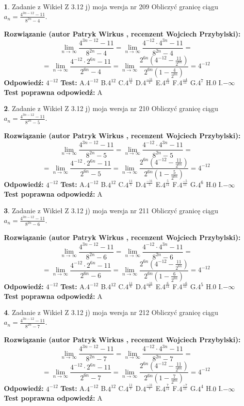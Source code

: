 \documentclass[12pt, a4paper]{article}
\theoremstyle{definition} %
\newtheorem{zad}{}
\newcommand{\zadStart}[1]{\begin{zad}#1\newline}
\newcommand{\zadStop}{\end{zad}}
\newcommand{\rozwStart}[2]{\noindent \textbf{Rozwiązanie (autor #1 , recenzent #2): }\newline}
\newcommand{\rozwStop}{\newline}
\newcommand{\odpStart}{\noindent \textbf{Odpowiedź:}\newline}
\newcommand{\odpStop}{\newline}
\newcommand{\testStart}{\noindent \textbf{Test:}\newline}
\newcommand{\testStop}{\newline}
\newcommand{\kluczStart}{\noindent \textbf{Test poprawna odpowiedź:}\newline}
\newcommand{\kluczStop}{\newline}
\begin{document}
\zadStart{Zadanie z Wikieł Z 3.12 j) moja wersja nr 209}
Obliczyć granicę ciągu $a_{n}=\frac{4^{3n-12}-11}{8^{2n}-4}$.
\zadStop
\rozwStart{Patryk Wirkus}{Wojciech Przybylski}
$$\lim\limits_{n\to\infty}\frac{4^{3n-12}-11}{8^{2n}-4}= \lim\limits_{n\to\infty}\frac{4^{-12} \cdot 4^{3n}-11}{8^{2n}-4}=$$
$$= \lim\limits_{n\to\infty}\frac{4^{-12} \cdot 2^{6n}-11}{2^{6n}-4}= \lim\limits_{n\to\infty}\frac{2^{6n}(4^{-12} - \frac{11}{2^{6n}})}{2^{6n}(1-\frac{4}{2^{6n}})}= 4^{-12}$$
\rozwStop
\odpStart
$4^{-12}$
\odpStop
\testStart
A.$4^{-12}$
B.$4^{12}$
C.$4^{\frac{11}{4}}$
D.$4^{\frac{-11}{4}}$
E.$4^{\frac{4}{11}}$
F.$4^{\frac{-4}{11}}$
G.$4^{7}$
H.$0$
I.$-\infty$
\testStop
\kluczStart
A
\kluczStop



\zadStart{Zadanie z Wikieł Z 3.12 j) moja wersja nr 210}
Obliczyć granicę ciągu $a_{n}=\frac{4^{3n-12}-11}{8^{2n}-5}$.
\zadStop
\rozwStart{Patryk Wirkus}{Wojciech Przybylski}
$$\lim\limits_{n\to\infty}\frac{4^{3n-12}-11}{8^{2n}-5}= \lim\limits_{n\to\infty}\frac{4^{-12} \cdot 4^{3n}-11}{8^{2n}-5}=$$
$$= \lim\limits_{n\to\infty}\frac{4^{-12} \cdot 2^{6n}-11}{2^{6n}-5}= \lim\limits_{n\to\infty}\frac{2^{6n}(4^{-12} - \frac{11}{2^{6n}})}{2^{6n}(1-\frac{5}{2^{6n}})}= 4^{-12}$$
\rozwStop
\odpStart
$4^{-12}$
\odpStop
\testStart
A.$4^{-12}$
B.$4^{12}$
C.$4^{\frac{11}{5}}$
D.$4^{\frac{-11}{5}}$
E.$4^{\frac{5}{11}}$
F.$4^{\frac{-5}{11}}$
G.$4^{6}$
H.$0$
I.$-\infty$
\testStop
\kluczStart
A
\kluczStop



\zadStart{Zadanie z Wikieł Z 3.12 j) moja wersja nr 211}
Obliczyć granicę ciągu $a_{n}=\frac{4^{3n-12}-11}{8^{2n}-6}$.
\zadStop
\rozwStart{Patryk Wirkus}{Wojciech Przybylski}
$$\lim\limits_{n\to\infty}\frac{4^{3n-12}-11}{8^{2n}-6}= \lim\limits_{n\to\infty}\frac{4^{-12} \cdot 4^{3n}-11}{8^{2n}-6}=$$
$$= \lim\limits_{n\to\infty}\frac{4^{-12} \cdot 2^{6n}-11}{2^{6n}-6}= \lim\limits_{n\to\infty}\frac{2^{6n}(4^{-12} - \frac{11}{2^{6n}})}{2^{6n}(1-\frac{6}{2^{6n}})}= 4^{-12}$$
\rozwStop
\odpStart
$4^{-12}$
\odpStop
\testStart
A.$4^{-12}$
B.$4^{12}$
C.$4^{\frac{11}{6}}$
D.$4^{\frac{-11}{6}}$
E.$4^{\frac{6}{11}}$
F.$4^{\frac{-6}{11}}$
G.$4^{5}$
H.$0$
I.$-\infty$
\testStop
\kluczStart
A
\kluczStop



\zadStart{Zadanie z Wikieł Z 3.12 j) moja wersja nr 212}
Obliczyć granicę ciągu $a_{n}=\frac{4^{3n-12}-11}{8^{2n}-7}$.
\zadStop
\rozwStart{Patryk Wirkus}{Wojciech Przybylski}
$$\lim\limits_{n\to\infty}\frac{4^{3n-12}-11}{8^{2n}-7}= \lim\limits_{n\to\infty}\frac{4^{-12} \cdot 4^{3n}-11}{8^{2n}-7}=$$
$$= \lim\limits_{n\to\infty}\frac{4^{-12} \cdot 2^{6n}-11}{2^{6n}-7}= \lim\limits_{n\to\infty}\frac{2^{6n}(4^{-12} - \frac{11}{2^{6n}})}{2^{6n}(1-\frac{7}{2^{6n}})}= 4^{-12}$$
\rozwStop
\odpStart
$4^{-12}$
\odpStop
\testStart
A.$4^{-12}$
B.$4^{12}$
C.$4^{\frac{11}{7}}$
D.$4^{\frac{-11}{7}}$
E.$4^{\frac{7}{11}}$
F.$4^{\frac{-7}{11}}$
G.$4^{4}$
H.$0$
I.$-\infty$
\testStop
\kluczStart
A
\kluczStop
\end{document}
